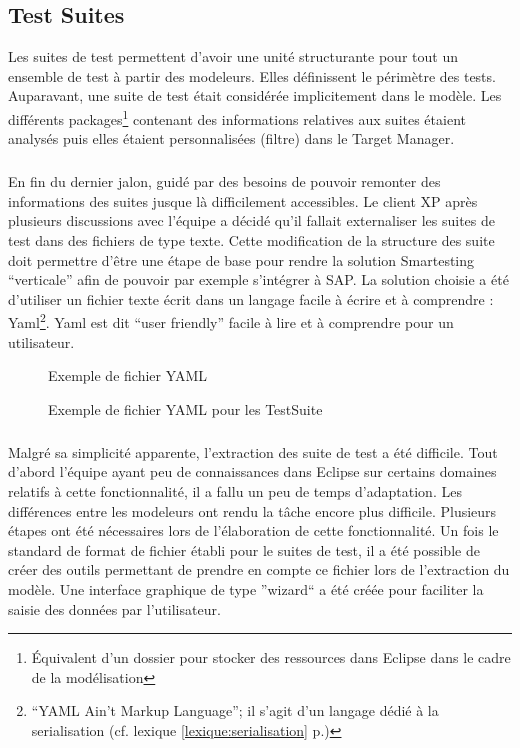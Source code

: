 \subsection{Test Suites}
Les suites de test permettent d'avoir une unité structurante pour tout un ensemble de test à partir des modeleurs. Elles définissent le périmètre des tests. Auparavant, une suite de test était considérée implicitement dans le modèle. Les différents packages\footnote{Équivalent d'un dossier pour stocker des ressources dans Eclipse dans le cadre de la modélisation} contenant des informations relatives aux suites étaient analysés puis elles étaient personnalisées (filtre) dans le Target Manager. 
\subparagraph*{}
En fin du dernier jalon, guidé par des besoins de pouvoir remonter des informations des suites jusque là difficilement accessibles. Le client XP après plusieurs discussions avec l'équipe a décidé qu'il fallait externaliser les suites de test dans des fichiers de type texte. Cette modification de la structure des suite doit permettre d'être une étape de base pour rendre la solution Smartesting ``verticale'' afin de pouvoir par exemple s'intégrer à SAP. La solution choisie a été d'utiliser un fichier texte écrit dans un langage facile à écrire et à comprendre : Yaml\footnote{``YAML Ain't Markup Language''; il s'agit d'un langage dédié à la serialisation (cf. lexique \ref{lexique:serialisation} p.\pageref{lexique:serialisation})}. Yaml est dit ``user friendly'' facile à lire et à comprendre pour un utilisateur.
\begin{figure}[!ht]
\centering
{}
\caption{Exemple de fichier YAML}
\label{figure:exYaml}
\end{figure}
\begin{figure}[!ht]
\centering
{}
\caption{Exemple de fichier YAML pour les TestSuite}
\label{figure:exTestSuite}
\end{figure} 
\subparagraph*{}
Malgré sa simplicité apparente, l'extraction des suite de test a été difficile. Tout d'abord l'équipe ayant peu de connaissances dans Eclipse sur certains domaines relatifs à cette fonctionnalité, il a fallu un peu de temps d'adaptation. Les différences entre les modeleurs ont rendu la tâche encore plus difficile. Plusieurs étapes ont été nécessaires lors de l'élaboration de cette fonctionnalité. Un fois le standard de format de fichier établi pour le suites de test, il a été possible de créer des outils permettant de prendre en compte ce fichier lors de l'extraction du modèle. Une interface graphique de type ''wizard`` a été créée pour faciliter la saisie des données par l'utilisateur.
